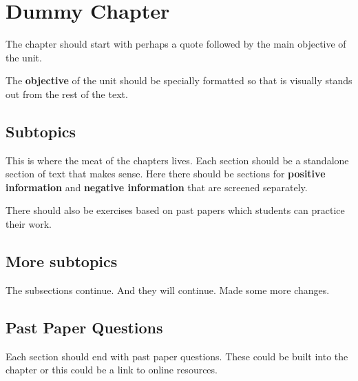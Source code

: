 \chapter{Dummy Chapter}

The chapter should start with perhaps a quote followed by the main objective of the unit. 

The \textbf{objective} of the unit should be specially formatted so that is visually stands out from the rest of the text.


\section{Subtopics}
This is where the meat of the chapters lives. Each section should be a standalone section of text that makes sense. Here there should be sections for \textbf{positive information} and \textbf{negative information} that are screened separately. 

There should also be exercises based on past papers which students can practice their work.



\section{More subtopics}

The subsections continue. And they will continue. Made some more changes.


\section{Past Paper Questions}

Each section should end with past paper questions. These could be built into the chapter or this could be a link to online resources.